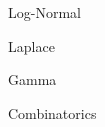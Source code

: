 \documentclass[11pt]{article}
\begin{document}
\begin{enumerate}
\begin{item}
\begin{enumerate}
\begin{item}
\begin{enumerate}
\begin{item}
\begin{enumerate}
                      \begin{item}
                        Log-Normal
                      \end{item}

                      \begin{item}
                        Laplace
                      \end{item}

                      \begin{item}
                        Gamma
                      \end{item}

                  \end{enumerate}

                \end{item}

            \end{enumerate}

          \end{item}

          \begin{item}
            Combinatorics
          \end{item}

      \end{enumerate}

    \end{item}

\end{enumerate}
\end{document}
